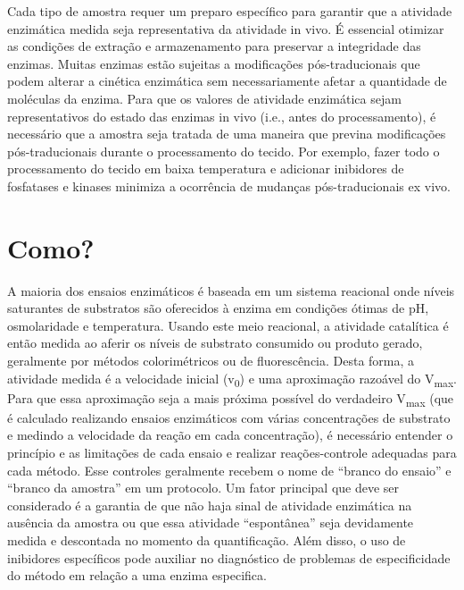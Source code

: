 \documentclass[
  9pt,
  american,
  a5paper,
  extrafontsizes,onecolumn,openright
  ]{memoir}
\begin{document}
Cada tipo de amostra requer um preparo específico para garantir que a atividade enzimática medida seja representativa da atividade in vivo. É essencial otimizar as condições de extração e armazenamento para preservar a integridade das enzimas. Muitas enzimas estão sujeitas a modificações pós-traducionais que podem alterar a cinética enzimática sem necessariamente afetar a quantidade de moléculas da enzima. Para que os valores de atividade enzimática sejam representativos do estado das enzimas in vivo (i.e., antes do processamento), é necessário que a amostra seja tratada de uma maneira que previna modificações pós-traducionais durante o processamento do tecido. Por exemplo, fazer todo o processamento do tecido em baixa temperatura e adicionar inibidores de fosfatases e kinases minimiza a ocorrência de mudanças pós-traducionais ex vivo.

\section{Como?}\label{como}

A maioria dos ensaios enzimáticos é baseada em um sistema reacional onde níveis saturantes de substratos são oferecidos à enzima em condições ótimas de pH, osmolaridade e temperatura. Usando este meio reacional, a atividade catalítica é então medida ao aferir os níveis de substrato consumido ou produto gerado, geralmente por métodos colorimétricos ou de fluorescência. Desta forma, a atividade medida é a velocidade inicial (v\textsubscript{0}) e uma aproximação razoável do V\textsubscript{max}. Para que essa aproximação seja a mais próxima possível do verdadeiro V\textsubscript{max} (que é calculado realizando ensaios enzimáticos com várias concentrações de substrato e medindo a velocidade da reação em cada concentração), é necessário entender o princípio e as limitações de cada ensaio e realizar reações-controle adequadas para cada método. Esse controles geralmente recebem o nome de \enquote{branco do ensaio} e \enquote{branco da amostra} em um protocolo. Um fator principal que deve ser considerado é a garantia de que não haja sinal de atividade enzimática na ausência da amostra ou que essa atividade \enquote{espontânea} seja devidamente medida e descontada no momento da quantificação. Além disso, o uso de inibidores específicos pode auxiliar no diagnóstico de problemas de especificidade do método em relação a uma enzima especifica.
\end{document}

